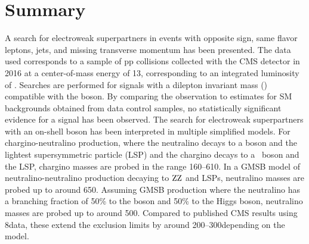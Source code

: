 \section{Summary}
\noindent
\justify
A search for electroweak superpartners in events with opposite sign, same flavor leptons, jets, and missing transverse momentum has been presented. 
The data used corresponds to a sample of pp collisions collected with the CMS detector in 2016 at a center-of-mass energy of 13\TeV, corresponding to an integrated luminosity of \lint.
Searches are performed for signals with a dilepton invariant mass (\mll) compatible with the \PZ boson.
By comparing the observation to estimates for SM backgrounds obtained from data control samples, no statistically significant evidence for a signal has been observed.
The search for electroweak superpartners with an on-shell \PZ boson has been interpreted in multiple simplified models.
\newpara
\noindent\justify
For chargino-neutralino production, where the neutralino decays to a \PZ boson and the lightest supersymmetric particle (LSP) and the chargino decays to a \PW\ boson and the LSP, chargino masses are probed in the range 160--610\GeV.
In a GMSB model of neutralino-neutralino production decaying to $\mathrm{Z}\mathrm{Z}$ and LSPs, neutralino masses are probed up to around 650\GeV.
Assuming GMSB production where the neutralino has a branching fraction of 50\% to the \PZ boson and 50\% to the Higgs boson, neutralino masses are probed up to around 500\GeV.
Compared to published CMS results using 8\TeV data, these extend the exclusion limits by around 200--300\GeV depending on the model.
